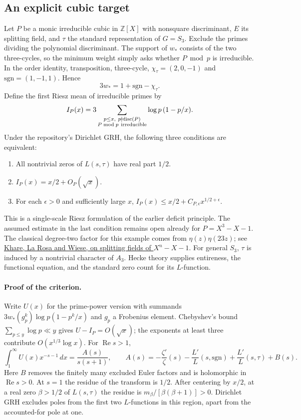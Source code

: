 \subsection*{An explicit cubic target}
Let $P$ be a monic irreducible cubic in $\mathbb Z[X]$ with nonsquare discriminant, $E$ its splitting field, and $\tau$ the standard representation of $G=S_3$. Exclude the primes dividing the polynomial discriminant. The support of $w_*$ consists of the two three-cycles, so the minimum weight simply asks whether $P\bmod p$ is irreducible. In the order identity, transposition, three-cycle, $\chi_\tau=(2,0,-1)$ and $\mathrm{sgn}=(1,-1,1)$. Hence
\[
                    3w_* =1+\mathrm{sgn}-\chi_\tau.
\]
Define the first Riesz mean of irreducible primes by
\[
 I_P(x)=3\sum_{\substack{p\le x,\ p\nmid\operatorname{disc}(P)\\
                           P\bmod p\ {\rm irreducible}}}
                  \log p\,(1-p/x).
\]
Under the repository's Dirichlet GRH, the following three conditions are equivalent:
\begin{enumerate}
\item All nontrivial zeros of $L(s,\tau)$ have real part $1/2$.
\item $I_P(x)=x/2+O_P(\sqrt{x})$.
\item For each $\epsilon>0$ and sufficiently large $x$, $I_P(x)\le x/2+C_{P,\epsilon}x^{1/2+\epsilon}$.
\end{enumerate}
This is a single-scale Riesz formulation of the earlier deficit principle. The assumed estimate in the last condition remains open already for $P=X^3-X-1$. The classical degree-two factor for this example comes from $\eta(z)\eta(23z)$; see
\href{https://www.sciencedirect.com/science/article/pii/S0723086923000087}{Khare, La Rosa and Wiese, on splitting fields of $X^n-X-1$}.
For general $S_3$, $\tau$ is induced by a nontrivial character of $A_3$. Hecke theory supplies entireness, the functional equation, and the standard zero count for its $L$-function.

\paragraph{Proof of the criterion.}
Write $U(x)$ for the prime-power version with summands $3w_*(g_p^k)\log p(1-p^k/x)$ and $g_p$ a Frobenius element. Chebyshev's bound $\sum_{p\le y}\log p\ll y$ gives $U-I_P=O(\sqrt{x})$; the exponents at least three contribute $O(x^{1/3}\log x)$. For $\operatorname{Re}s>1$,
\[
 \int_1^\infty U(x)x^{-s-1}\,dx=\frac{A(s)}{s(s+1)},\qquad
 A(s)=-\frac{\zeta'}{\zeta}(s)-\frac{L'}L(s,\mathrm{sgn})
                      +\frac{L'}L(s,\tau)+B(s).
\]
Here $B$ removes the finitely many excluded Euler factors and is holomorphic in $\operatorname{Re}s>0$. At $s=1$ the residue of the transform is $1/2$. After centering by $x/2$, at a real zero $\beta>1/2$ of $L(s,\tau)$ the residue is $m_\beta/[\beta(\beta+1)]>0$. Dirichlet GRH excludes poles from the first two $L$-functions in this region, apart from the accounted-for pole at one.

